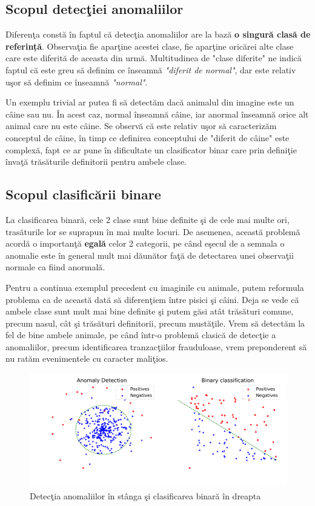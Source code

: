 \subsection{Scopul detecţiei anomaliilor}

Diferenţa constă în faptul că detecţia anomaliilor are la bază \textbf{o singură clasă
de referință}. Observaţia fie aparţine acestei clase, fie aparţine oricărei alte clase 
care este diferită de aceasta din urmă. Multitudinea de "clase diferite" ne indică
faptul că este greu să definim ce înseamnă \textit{"diferit de normal"}, dar este relativ uşor
să definim ce înseamnă \textit{"normal"}.

Un exemplu trivial ar putea fi să detectăm dacă animalul din imagine este un câine sau nu.
În acest caz, normal înseamnă câine, iar anormal înseamnă orice alt animal care nu este
câine. Se observă că este relativ uşor să caracterizăm conceptul de câine, în timp ce 
definirea conceptului de "diferit de câine" este complexă, fapt ce ar pune în dificultate
un clasificator binar care prin definiţie învaţă trăsăturile definitorii pentru ambele 
clase. 

\subsection{Scopul clasificării binare}

La clasificarea binară, cele 2 clase sunt bine 
definite şi de cele mai multe ori, trasăturile lor se suprapun în mai multe locuri. De 
asemenea, această problemă acordă o importanţă \textbf{egală} celor 2 categorii, pe când
eşecul de a semnala o anomalie este în general mult mai dăunător faţă de 
detectarea unei observaţii normale ca fiind anormală. 

Pentru a continua exemplul precedent cu imaginile cu animale, putem reformula problema 
ca de această dată să diferenţiem între pisici şi câini. Deja se vede că ambele clase 
sunt mult mai bine definite şi putem găsi atât trăsături comune, precum nasul, cât şi 
trăsături definitorii, precum mustăţile. Vrem să detectăm la fel de bine ambele animale, 
pe când într-o problemă clasică de detecţie a anomaliilor, precum identificarea 
tranzacţiilor frauduloase, vrem preponderent să nu ratăm evenimentele cu 
caracter maliţios.


\begin{figure}[H]
    \centering
    \includegraphics[width=\linewidth]{images/The-anomaly-detection-and-the-classification-learning-schemas.pdf}
    \caption{Detecţia anomaliilor în stânga şi clasificarea binară în dreapta}
\end{figure}